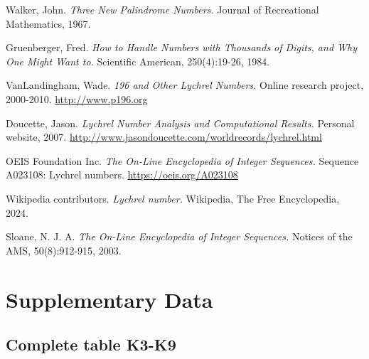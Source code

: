\documentclass[12pt,a4paper]{article}
\theoremstyle{remark}
\begin{document}

\begin{thebibliography}{99}

Walker, John.
\textit{Three New Palindrome Numbers.}
Journal of Recreational Mathematics, 1967.

Gruenberger, Fred.
\textit{How to Handle Numbers with Thousands of Digits, and Why One Might Want to.}
Scientific American, 250(4):19-26, 1984.

VanLandingham, Wade.
\textit{196 and Other Lychrel Numbers.}
Online research project, 2000-2010.
\url{http://www.p196.org}

Doucette, Jason.
\textit{Lychrel Number Analysis and Computational Results.}
Personal website, 2007.
\url{http://www.jasondoucette.com/worldrecords/lychrel.html}

OEIS Foundation Inc.
\textit{The On-Line Encyclopedia of Integer Sequences.}
Sequence A023108: Lychrel numbers.
\url{https://oeis.org/A023108}

Wikipedia contributors.
\textit{Lychrel number.}
Wikipedia, The Free Encyclopedia, 2024.

Sloane, N. J. A.
\textit{The On-Line Encyclopedia of Integer Sequences.}
Notices of the AMS, 50(8):912-915, 2003.

\end{thebibliography}


\appendix

\section{Supplementary Data}
\label{app:data}

\subsection{Complete table K3-K9}
\end{document}
